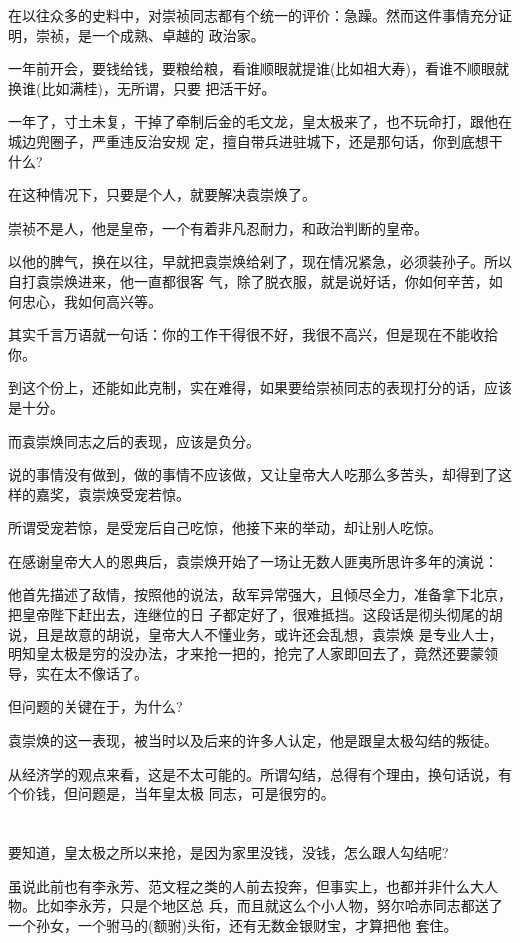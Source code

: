 \documentclass[11pt,a4paper,onecolumn]{article}
\begin{document}
在以往众多的史料中，对崇祯同志都有个统一的评价：急躁。然而这件事情充分证明，崇祯，是一个成熟、卓越的
政治家。

一年前开会，要钱给钱，要粮给粮，看谁顺眼就提谁(比如祖大寿)，看谁不顺眼就换谁(比如满桂)，无所谓，只要
把活干好。

一年了，寸土未复，干掉了牵制后金的毛文龙，皇太极来了，也不玩命打，跟他在城边兜圈子，严重违反治安规
定，擅自带兵进驻城下，还是那句话，你到底想干什么?

在这种情况下，只要是个人，就要解决袁崇焕了。

崇祯不是人，他是皇帝，一个有着非凡忍耐力，和政治判断的皇帝。

以他的脾气，换在以往，早就把袁崇焕给剁了，现在情况紧急，必须装孙子。所以自打袁崇焕进来，他一直都很客
气，除了脱衣服，就是说好话，你如何辛苦，如何忠心，我如何高兴等。

其实千言万语就一句话：你的工作干得很不好，我很不高兴，但是现在不能收拾你。

到这个份上，还能如此克制，实在难得，如果要给崇祯同志的表现打分的话，应该是十分。

而袁崇焕同志之后的表现，应该是负分。

说的事情没有做到，做的事情不应该做，又让皇帝大人吃那么多苦头，却得到了这样的嘉奖，袁崇焕受宠若惊。

所谓受宠若惊，是受宠后自己吃惊，他接下来的举动，却让别人吃惊。

在感谢皇帝大人的恩典后，袁崇焕开始了一场让无数人匪夷所思许多年的演说：

他首先描述了敌情，按照他的说法，敌军异常强大，且倾尽全力，准备拿下北京，把皇帝陛下赶出去，连继位的日
子都定好了，很难抵挡。这段话是彻头彻尾的胡说，且是故意的胡说，皇帝大人不懂业务，或许还会乱想，袁崇焕
是专业人士，明知皇太极是穷的没办法，才来抢一把的，抢完了人家即回去了，竟然还要蒙领导，实在太不像话了。

但问题的关键在于，为什么?

袁崇焕的这一表现，被当时以及后来的许多人认定，他是跟皇太极勾结的叛徒。

从经济学的观点来看，这是不太可能的。所谓勾结，总得有个理由，换句话说，有个价钱，但问题是，当年皇太极
同志，可是很穷的。

\section[\thesection]{}

要知道，皇太极之所以来抢，是因为家里没钱，没钱，怎么跟人勾结呢?

虽说此前也有李永芳、范文程之类的人前去投奔，但事实上，也都并非什么大人物。比如李永芳，只是个地区总
兵，而且就这么个小人物，努尔哈赤同志都送了一个孙女，一个驸马的(额驸)头衔，还有无数金银财宝，才算把他
套住。
\end{document}
